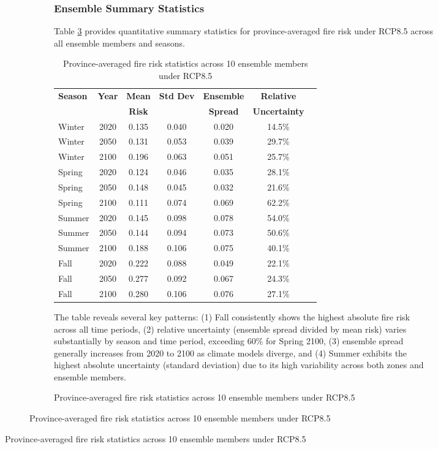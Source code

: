 \documentclass[11pt,a4paper]{article}
\begin{document}
\begin{figure}[H]
\begin{figure}[H]
\begin{figure}[H]
\subsubsection{Ensemble Summary Statistics}

Table \ref{tab:ensemble_stats} provides quantitative summary statistics for province-averaged fire risk under RCP8.5 across all ensemble members and seasons.

\begin{table}[H]
\centering
\caption{Province-averaged fire risk statistics across 10 ensemble members under RCP8.5}
\label{tab:ensemble_stats}
\small
\begin{tabular}{lcccccc}
\toprule
\textbf{Season} & \textbf{Year} & \textbf{Mean} & \textbf{Std Dev} & \textbf{Ensemble} & \textbf{Relative} \\
 &  & \textbf{Risk} &  & \textbf{Spread} & \textbf{Uncertainty} \\
\midrule
Winter & 2020 & 0.135 & 0.040 & 0.020 & 14.5\% \\
Winter & 2050 & 0.131 & 0.053 & 0.039 & 29.7\% \\
Winter & 2100 & 0.196 & 0.063 & 0.051 & 25.7\% \\
Spring & 2020 & 0.124 & 0.046 & 0.035 & 28.1\% \\
Spring & 2050 & 0.148 & 0.045 & 0.032 & 21.6\% \\
Spring & 2100 & 0.111 & 0.074 & 0.069 & 62.2\% \\
Summer & 2020 & 0.145 & 0.098 & 0.078 & 54.0\% \\
Summer & 2050 & 0.144 & 0.094 & 0.073 & 50.6\% \\
Summer & 2100 & 0.188 & 0.106 & 0.075 & 40.1\% \\
Fall & 2020 & 0.222 & 0.088 & 0.049 & 22.1\% \\
Fall & 2050 & 0.277 & 0.092 & 0.067 & 24.3\% \\
Fall & 2100 & 0.280 & 0.106 & 0.076 & 27.1\% \\
\bottomrule
\end{tabular}
\end{table}

The table reveals several key patterns: (1) Fall consistently shows the highest absolute fire risk across all time periods, (2) relative uncertainty (ensemble spread divided by mean risk) varies substantially by season and time period, exceeding 60\% for Spring 2100, (3) ensemble spread generally increases from 2020 to 2100 as climate models diverge, and (4) Summer exhibits the highest absolute uncertainty (standard deviation) due to its high variability across both zones and ensemble members.


\end{figure}
\end{figure}
\end{figure}
\end{document}
